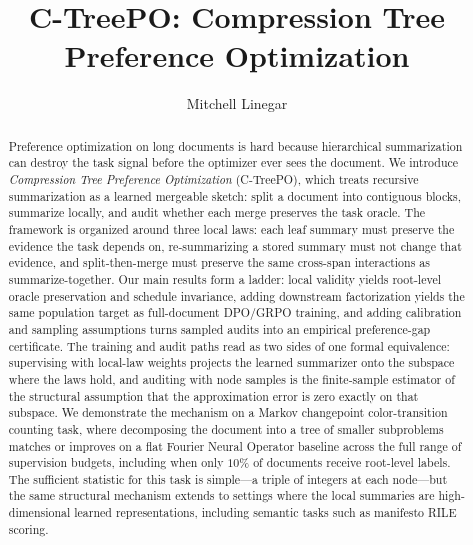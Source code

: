 \documentclass[11pt]{article}
\title{C-TreePO: Compression Tree Preference Optimization}
\author{Mitchell Linegar}
\date{}
\begin{document}
\maketitle

\begin{abstract}
Preference optimization on long documents is hard because hierarchical summarization can destroy the task signal before the optimizer ever sees the document.
We introduce \emph{Compression Tree Preference Optimization} (C-TreePO), which treats recursive summarization as a learned mergeable sketch: split a document into contiguous blocks, summarize locally, and audit whether each merge preserves the task oracle.
The framework is organized around three local laws: each leaf summary must preserve the evidence the task depends on, re-summarizing a stored summary must not change that evidence, and split-then-merge must preserve the same cross-span interactions as summarize-together.
Our main results form a ladder: local validity yields root-level oracle preservation and schedule invariance, adding downstream factorization yields the same population target as full-document DPO/GRPO training, and adding calibration and sampling assumptions turns sampled audits into an empirical preference-gap certificate. The training and audit paths read as two sides of one formal equivalence: supervising with local-law weights projects the learned summarizer onto the subspace where the laws hold, and auditing with node samples is the finite-sample estimator of the structural assumption that the approximation error is zero exactly on that subspace.
We demonstrate the mechanism on a Markov changepoint color-transition counting task, where decomposing the document into a tree of smaller subproblems matches or improves on a flat Fourier Neural Operator baseline across the full range of supervision budgets, including when only $10\%$ of documents receive root-level labels.
The sufficient statistic for this task is simple---a triple of integers at each node---but the same structural mechanism extends to settings where the local summaries are high-dimensional learned representations, including semantic tasks such as manifesto RILE scoring.
\end{abstract}

















\end{document}
